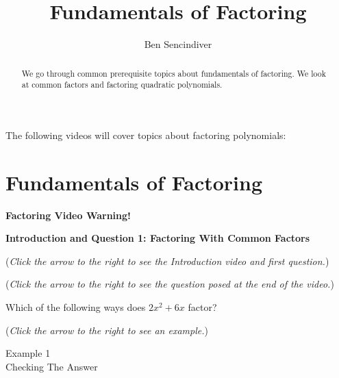 \documentclass{ximera}
\title[Prerequisite Videos: ]{Fundamentals of Factoring}
\author{Ben Sencindiver}
\begin{document}
\begin{abstract}
  We go through common prerequisite topics about fundamentals of factoring. 
  We look at common factors and factoring quadratic polynomials.
\end{abstract}
\maketitle

The following videos will cover topics about factoring polynomials: 

\section{Fundamentals of Factoring}
\textbf{Factoring Video Warning!}


\textbf{Introduction and Question 1: Factoring With Common Factors}
\begin{question}
\begin{flushright}
{\color{blue}(\emph{Click the arrow to the right to see the Introduction video and first question.})}
\end{flushright}
\begin{center}
\begin{expandable}
{\color{blue}(\emph{Click the arrow to the right to see the  question
posed at the end of the video.})}
\begin{expandable}
Which of the following ways does $2x^2 + 6x$ factor?
\begin{multipleChoice}
\end{multipleChoice}
\begin{flushright}
{\color{blue}(\emph{Click the arrow to the right to see an example.})}
\end{flushright}
\begin{expandable}
Example 1
\\

Checking The Answer
\end{expandable}
\end{expandable}
\end{expandable}
\end{center}
\end{question}
\end{document}
